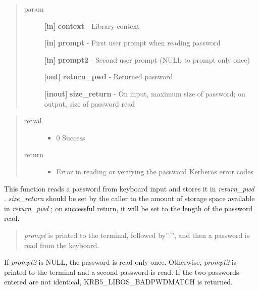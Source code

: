 \documentclass[letterpaper,10pt,english]{sphinxmanual}
\begin{document}
\begin{quote}\begin{description}
\item[{param}] \leavevmode
\textbf{{[}in{]}} \textbf{context} - Library context

\textbf{{[}in{]}} \textbf{prompt} - First user prompt when reading password

\textbf{{[}in{]}} \textbf{prompt2} - Second user prompt (NULL to prompt only once)

\textbf{{[}out{]}} \textbf{return\_pwd} - Returned password

\textbf{{[}inout{]}} \textbf{size\_return} - On input, maximum size of password; on output, size of password read

\end{description}\end{quote}
\begin{quote}\begin{description}
\item[{retval}] \leavevmode\begin{itemize}
\item {} 
0   Success

\end{itemize}

\item[{return}] \leavevmode\begin{itemize}
\item {} 
Error in reading or verifying the password Kerberos error codes

\end{itemize}

\end{description}\end{quote}

This function reads a password from keyboard input and stores it in \emph{return\_pwd} . \emph{size\_return} should be set by the caller to the amount of storage space available in \emph{return\_pwd} ; on successful return, it will be set to the length of the password read.
\begin{quote}

\emph{prompt} is printed to the terminal, followed by'':'', and then a password is read from the keyboard.
\end{quote}

If \emph{prompt2} is NULL, the password is read only once. Otherwise, \emph{prompt2} is printed to the terminal and a second password is read. If the two passwords entered are not identical, KRB5\_LIBOS\_BADPWDMATCH is returned.
\end{document}
